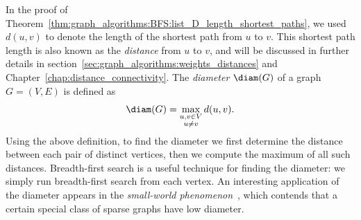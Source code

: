 In the proof of
Theorem~\ref{thm:graph_algorithms:BFS:list_D_length_shortest_paths},
we used $d(u,v)$ to denote the length of the shortest path from $u$ to
$v$. This shortest path length is also known as the
\emph{distance} from $u$ to $v$, and will be
discussed in further details in
section~\ref{sec:graph_algorithms:weights_distances} and
Chapter~\ref{chap:distance_connectivity}. The
\emph{diameter} $\diam(G)$ of a graph $G = (V,E)$ is
defined as
\begin{equation}
\label{eqn:graph_algorithms:graph_diameter}
\diam(G)
=
\max_{\substack{u,v \in V \\ u \neq v}} d(u,v).
\end{equation}
Using the above definition, to find the diameter we
first determine the distance between each pair of
distinct vertices, then we compute the maximum of all such
distances. Breadth-first search is a
useful technique for finding the diameter: we simply
run breadth-first search from each
vertex. An interesting application of the diameter
appears in the
\emph{small-world phenomenon}~\cite{Kleinberg2000,
  Milgram1967,WattsStrogatz1998}, which contends that a certain
special class of sparse graphs have low diameter.




